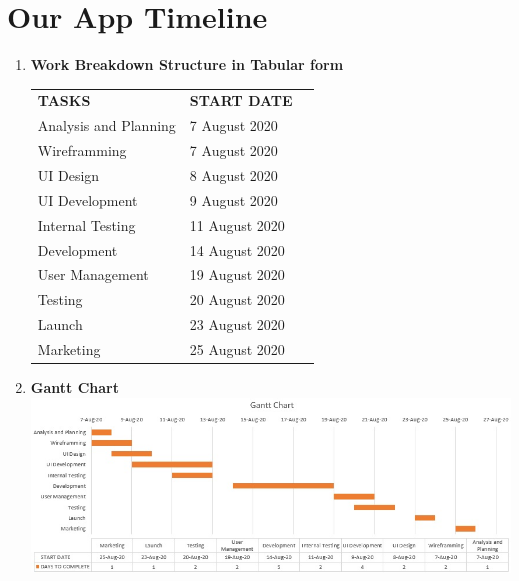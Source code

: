 \section{Our App Timeline}
\begin{enumerate}
\item \textbf{Work Breakdown Structure in Tabular form}
\newline
\begin{center}
\begin{tabular}{ l l l  }
 \textbf{TASKS} & \textbf{START DATE}  \\
 Analysis and Planning & 7 August 2020  \\  
Wireframming & 7 August 2020 \\
UI Design & 8 August 2020 \\
UI Development & 9 August 2020 \\
Internal Testing & 11 August 2020 \\
Development & 14 August 2020 \\
User Management & 19 August 2020 \\
Testing & 20 August 2020 \\
Launch & 23 August 2020 \\
Marketing & 25 August 2020
\end{tabular}
\end{center}
\item \textbf{Gantt Chart} 
\newline
\includegraphics[scale=.7]{gantt chart photo.jpg}
\end{enumerate}

